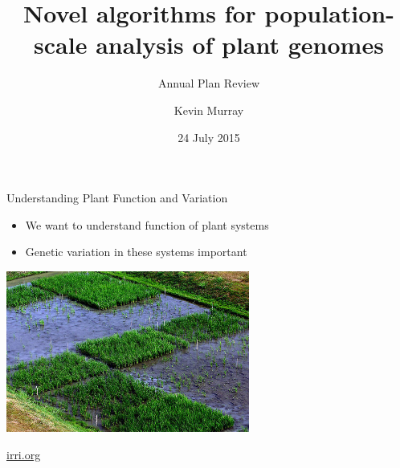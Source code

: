\documentclass[t]{beamer}
\title{Novel algorithms for population-scale analysis of plant genomes}
\subtitle{\small{Annual Plan Review}}
\author{Kevin Murray}
\institute{Borevitz Lab, CPEB, ANU}
\date{24 July 2015}
\begin{document}
{
\begin{frame}
  \titlepage
  \vfill
\end{frame}
}


\begin{frame}{Understanding Plant Function and Variation}
  \begin{itemize}
    \item We want to understand function of plant systems
    \item Genetic variation in these systems important
  \end{itemize}
  \begin{center}
    \includegraphics[width=0.6\textwidth]{img/rice-paddy.jpg}
  \end{center}
  \tiny{\url{irri.org}}
\end{frame}
\end{document}
